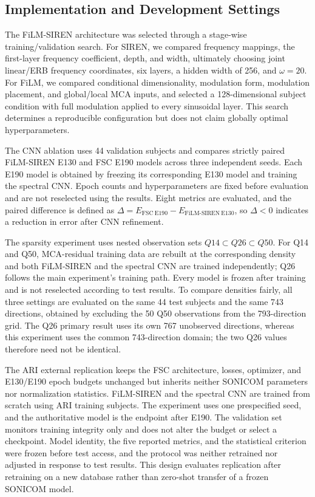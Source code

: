 \documentclass[UTF8,a4paper]{article}
\begin{document}
\subsection{Implementation and Development Settings}

The FiLM-SIREN architecture was selected through a stage-wise training/validation search. For SIREN, we compared frequency mappings, the first-layer frequency coefficient, depth, and width, ultimately choosing joint linear/ERB frequency coordinates, six layers, a hidden width of 256, and $\omega=20$. For FiLM, we compared conditional dimensionality, modulation form, modulation placement, and global/local MCA inputs, and selected a 128-dimensional subject condition with full modulation applied to every sinusoidal layer. This search determines a reproducible configuration but does not claim globally optimal hyperparameters.

The CNN ablation uses 44 validation subjects and compares strictly paired FiLM-SIREN E130 and FSC E190 models across three independent seeds. Each E190 model is obtained by freezing its corresponding E130 model and training the spectral CNN. Epoch counts and hyperparameters are fixed before evaluation and are not reselected using the results. Eight metrics are evaluated, and the paired difference is defined as $\Delta=E_{\mathrm{FSC\ E190}}-E_{\mathrm{FiLM\text{-}SIREN\ E130}}$, so $\Delta<0$ indicates a reduction in error after CNN refinement.

The sparsity experiment uses nested observation sets $Q14\subset Q26\subset Q50$. For Q14 and Q50, MCA-residual training data are rebuilt at the corresponding density and both FiLM-SIREN and the spectral CNN are trained independently; Q26 follows the main experiment's training path. Every model is frozen after training and is not reselected according to test results. To compare densities fairly, all three settings are evaluated on the same 44 test subjects and the same 743 directions, obtained by excluding the 50 Q50 observations from the 793-direction grid. The Q26 primary result uses its own 767 unobserved directions, whereas this experiment uses the common 743-direction domain; the two Q26 values therefore need not be identical.

The ARI external replication keeps the FSC architecture, losses, optimizer, and E130/E190 epoch budgets unchanged but inherits neither SONICOM parameters nor normalization statistics. FiLM-SIREN and the spectral CNN are trained from scratch using ARI training subjects. The experiment uses one prespecified seed, and the authoritative model is the endpoint after E190. The validation set monitors training integrity only and does not alter the budget or select a checkpoint. Model identity, the five reported metrics, and the statistical criterion were frozen before test access, and the protocol was neither retrained nor adjusted in response to test results. This design evaluates replication after retraining on a new database rather than zero-shot transfer of a frozen SONICOM model.
\end{document}
